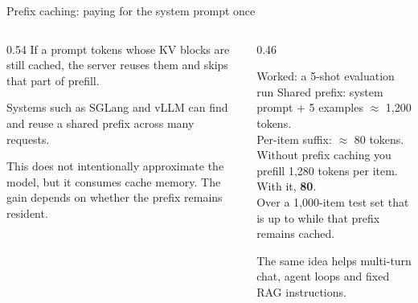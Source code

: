 \documentclass[aspectratio=169,10pt]{beamer}
\begin{document}
\begin{frame}{Prefix caching: paying for the system prompt once}
  \begin{columns}[T]
    \begin{column}{0.54\textwidth}
      If a prompt  tokens whose KV blocks are still cached,
      the server reuses them and skips that part of prefill.
      \vspace{0.5em}

      Systems such as SGLang and vLLM can find and reuse a shared prefix across
      many requests.
      \vspace{0.5em}

      This does not intentionally approximate the model, but it consumes cache
      memory. The gain depends on whether the prefix remains resident.
    \end{column}
    \begin{column}{0.46\textwidth}
      \begin{block}{Worked: a 5-shot evaluation run}
        \small
        Shared prefix: system prompt + 5 examples $\approx$ 1{,}200 tokens.\\
        Per-item suffix: $\approx$ 80 tokens.\\[0.4em]
        Without prefix caching you prefill 1{,}280 tokens per item.
        With it, \textbf{80}.\\[0.4em]
        Over a 1{,}000-item test set that is
        up to  while that prefix remains
        cached.
      \end{block}
      \vspace{0.2em}
      \small
      The same idea helps multi-turn chat, agent loops and fixed RAG
      instructions.
    \end{column}
  \end{columns}
\end{frame}
\end{document}
